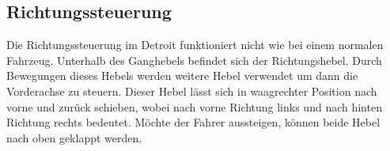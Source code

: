 \subsection{Richtungssteuerung}

Die Richtungssteuerung im Detroit funktioniert nicht wie bei einem normalen Fahrzeug. Unterhalb des Ganghebels befindet sich der Richtungshebel. Durch Bewegungen dieses Hebels werden weitere Hebel verwendet um dann die Vorderachse zu steuern. Dieser Hebel lässt sich in waagrechter Position nach vorne und zurück schieben, wobei nach vorne Richtung links und nach hinten Richtung rechts bedeutet. Möchte der Fahrer aussteigen, können beide Hebel nach oben geklappt werden.


\newpage